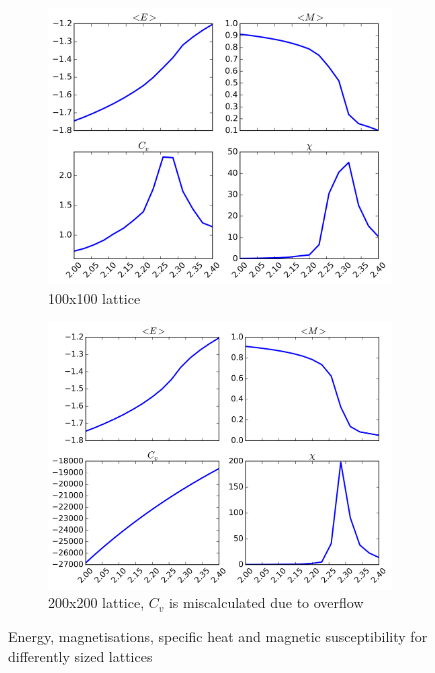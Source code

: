 \documentclass[11pt,a4paper,draft]{article}
\numberwithin{equation}{section}
\begin{document}
\begin{figure}
\begin{subfigure}{0.49\textwidth}
\centering
\includegraphics[width=\textwidth]{pics/e100.png}
\caption{100x100 lattice}
\label{fig:e100}
\end{subfigure}
%
\begin{subfigure}{0.49\textwidth}
\centering
\includegraphics[width=\textwidth]{pics/e200.png}
\caption{200x200 lattice, $C_v$ is miscalculated due to overflow}
\label{fig:e200}
\end{subfigure}

\caption{Energy, magnetisations, specific heat and magnetic 
susceptibility for differently sized lattices}
\label{fig:EM}
\end{figure}
\end{document}
